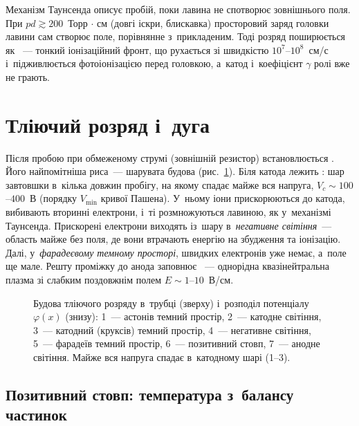 Механізм Таунсенда описує пробій, поки лавина не спотворює зовнішнього поля. При
$pd\gtrsim200$~Торр$\,\cdot\,$см (довгі іскри, блискавка) просторовий заряд головки лавини
сам створює поле, порівнянне з~прикладеним. Тоді розряд поширюється як ~---
тонкий іонізаційний фронт, що рухається зі швидкістю $10^{7}$--$10^{8}$~см/с і~підживлюється
фотоіонізацією перед головкою, а~катод і~коефіцієнт $\gamma$ ролі вже не грають.

\section{Тліючий розряд і~дуга}\label{sec:glow}

Після пробою при обмеженому струмі (зовнішній резистор) встановлюється . Його найпомітніша риса~--- шарувата будова (рис.~\ref{fig:glow}). Біля катода
лежить : шар завтовшки в~кілька довжин пробігу, на якому спадає майже
вся напруга, $V_c\sim100$--$400$~В (порядку $V_{\min}$ кривої Пашена). У~ньому іони прискорюються
до катода, вибивають вторинні електрони, і~ті розмножуються лавиною, як у~механізмі Таунсенда.
Прискорені електрони виходять із~шару в~\emph{негативне світіння}~--- область майже без поля,
де вони втрачають енергію на збудження та іонізацію. Далі, у~\emph{фарадеєвому темному
просторі}, швидких електронів уже немає, а~поле ще мале. Решту проміжку до анода заповнює
~--- однорідна квазінейтральна плазма зі слабким поздовжнім полем
$E\sim1$--$10$~В/см.

\begin{figure}[ht]
	\centering
	\caption{Будова тліючого розряду в~трубці (зверху) і~розподіл потенціалу $\varphi(x)$ (знизу):
	1~--- астонів темний простір, 2~--- катодне світіння, 3~--- катодний (круксів) темний простір,
	4~--- негативне світіння, 5~--- фарадеїв темний простір, 6~--- позитивний стовп, 7~--- анодне
	світіння. Майже вся напруга спадає в~катодному шарі (1--3).}
	\label{fig:glow}
\end{figure}

\subsection*{Позитивний стовп: температура з~балансу частинок}

